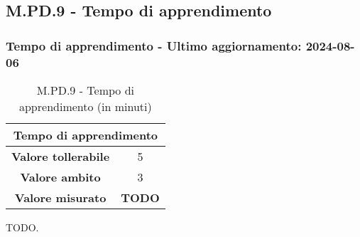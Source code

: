 \subsection{M.PD.9 - Tempo di apprendimento}

\subsubsection*{Tempo di apprendimento - Ultimo aggiornamento: 2024-08-06}

\begin{table}[H]
  \centering
  \begin{tabular}{|c|c|}
      \hline
      \multicolumn{2}{|c|}{Tempo di apprendimento} \\
      \hline
      \textbf{Valore tollerabile} & 5 \\
      \hline
      \textbf{Valore ambito} & 3 \\
      \hline
      \textbf{Valore misurato} & \textbf{TODO} \\
      \hline
  \end{tabular}
  \caption{M.PD.9 - Tempo di apprendimento (in minuti)}
\end{table}

\par TODO.